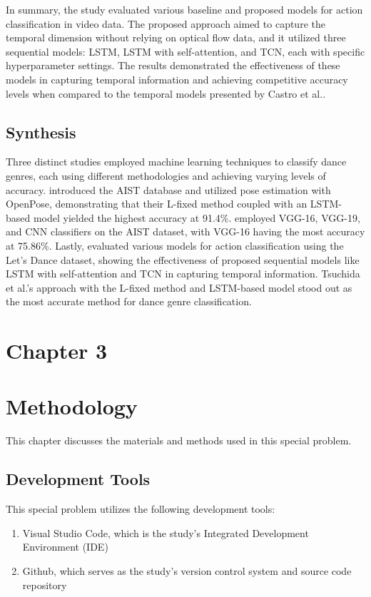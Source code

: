 \documentclass[12pt]{article}
\begin{document}
In summary, the study evaluated various baseline and proposed models for action classification in video data. The proposed approach aimed to capture the temporal dimension without relying on optical flow data, and it utilized three sequential models: LSTM, LSTM with self-attention, and TCN, each with specific hyperparameter settings. The results demonstrated the effectiveness of these models in capturing temporal information and achieving competitive accuracy levels when compared to the temporal models presented by Castro et al..


\subsection{Synthesis}
\noindent
\par
Three distinct studies employed machine learning techniques to classify dance genres, each using different methodologies and achieving varying levels of accuracy. \Textcite{aist} introduced the AIST database and utilized pose estimation with OpenPose, demonstrating that their L-fixed method coupled with an LSTM-based model yielded the highest accuracy at 91.4\%. \Textcite{bauskar2022dance} employed VGG-16, VGG-19, and CNN classifiers on the AIST dataset, with VGG-16 having the most accuracy at 75.86\%. Lastly, \Textcite{bendits} evaluated various models for action classification using the Let’s Dance dataset, showing the effectiveness of proposed sequential models like LSTM with self-attention and TCN in capturing temporal information. Tsuchida et al.'s approach with the L-fixed method and LSTM-based model stood out as the most accurate method for dance genre classification. 


\newpage
\section*{Chapter 3}
\section{Methodology}

\par This chapter discusses the materials and methods used in this special problem. 

\subsection{Development Tools}
\par
This special problem utilizes the following development tools: 
\begin{enumerate}
    \item Visual Studio Code, which is the study's Integrated Development Environment (IDE)
    \item Github, which serves as the study's version control system and source code repository
\end{enumerate}
\end{document}
